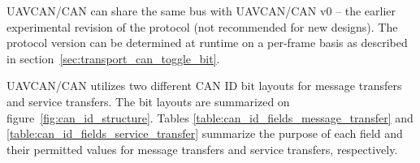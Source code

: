 UAVCAN/CAN can share the same bus with UAVCAN/CAN v0 -- the earlier experimental revision of the protocol
(not recommended for new designs).
The protocol version can be determined at runtime on a per-frame basis as described
in section~\ref{sec:transport_can_toggle_bit}.

UAVCAN/CAN utilizes two different CAN ID bit layouts for message transfers and service transfers.
The bit layouts are summarized on figure~\ref{fig:can_id_structure}.
Tables \ref{table:can_id_fields_message_transfer} and \ref{table:can_id_fields_service_transfer}
summarize the purpose of each field and their permitted values
for message transfers and service transfers, respectively.

\begin{figure}[H]
    \centering
\end{figure}

